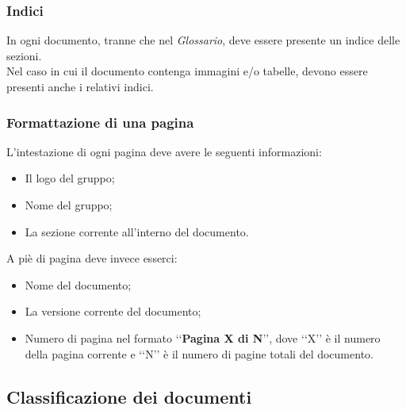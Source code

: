 \subsubsection{Indici}
\label{indici}
In ogni documento, tranne che nel \emph{Glossario}, deve essere presente un indice delle sezioni.
\\Nel caso in cui il documento contenga immagini e/o tabelle, devono essere presenti anche i relativi indici.

\subsubsection{Formattazione di una pagina}
\label{formattazionepag}
L'intestazione di ogni pagina deve avere le seguenti informazioni:
\begin{itemize}
\item Il logo del gruppo;
\item Nome del gruppo;
\item La sezione corrente all'interno del documento.
\end{itemize}
 A piè di pagina deve invece esserci:
 \begin{itemize}
 \item Nome del documento;
 \item La versione corrente del documento;
 \item Numero di pagina nel formato \lq\lq{}\textbf{Pagina X di N}\rq\rq{}, dove \lq\lq{}X\rq\rq{} è il numero della pagina corrente e \lq\lq{}N\rq\rq{} è il numero di pagine totali del documento.
 \end{itemize}

\subsection{Classificazione dei documenti}
\label{classificazione}


